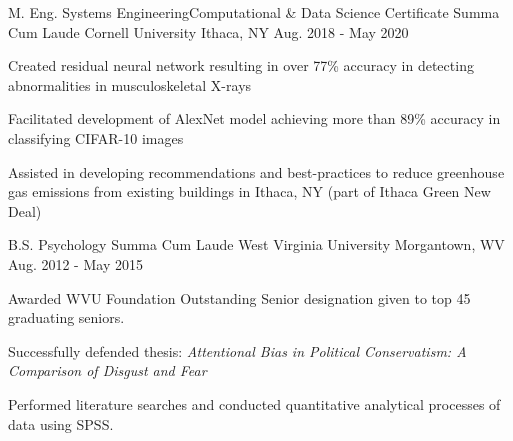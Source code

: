 


\begin{cventries}


\cventry
{M. Eng. Systems Engineering{\enskip\cdotp\enskip}Computational \& Data Science Certificate {\enskip\cdotp\enskip} Summa Cum Laude} %
{Cornell University} %
{Ithaca, NY} %
{Aug. 2018 -  May 2020} %
{ %
	\begin{cvitems}
		\item {Created residual neural network  resulting in over 77\% accuracy in detecting abnormalities in musculoskeletal X-rays}
		\item {Facilitated development of AlexNet model achieving more than 89\% accuracy in classifying CIFAR-10 images} 
		\item {Assisted in developing recommendations and best-practices to reduce greenhouse gas emissions from existing buildings in Ithaca, NY (part of Ithaca Green New Deal)}
	\end{cvitems}
}

\cventry
{B.S. Psychology {\enskip\cdotp\enskip} Summa Cum Laude} %
{West Virginia University} %
{Morgantown, WV} %
{Aug. 2012 -  May 2015} %
{ %
	\begin{cvitems}
		\item {Awarded WVU Foundation Outstanding Senior designation given to top 45 graduating seniors.}
		\item {Successfully defended thesis: \textit{Attentional Bias in Political Conservatism: A Comparison of Disgust and Fear}}
		\item {Performed literature searches and conducted quantitative analytical processes of data using SPSS.}
	\end{cvitems}
}


\end{cventries}